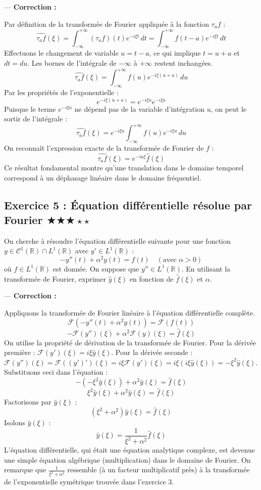 \documentclass[11pt,a4paper]{article}
\begin{document}
---
\textbf{Correction :}

Par définition de la transformée de Fourier appliquée à la fonction $\tau_a f$ :
$$ \widehat{\tau_a f}(\xi) = \int_{-\infty}^{+\infty} (\tau_a f)(t) e^{-i\xi t} \, dt = \int_{-\infty}^{+\infty} f(t-a) e^{-i\xi t} \, dt $$
Effectuons le changement de variable $u = t - a$, ce qui implique $t = u + a$ et $dt = du$. Les bornes de l'intégrale de $-\infty$ à $+\infty$ restent inchangées.
$$ \widehat{\tau_a f}(\xi) = \int_{-\infty}^{+\infty} f(u) e^{-i\xi (u+a)} \, du $$
Par les propriétés de l'exponentielle :
$$ e^{-i\xi (u+a)} = e^{-i\xi u} e^{-i\xi a} $$
Puisque le terme $e^{-i\xi a}$ ne dépend pas de la variable d'intégration $u$, on peut le sortir de l'intégrale :
$$ \widehat{\tau_a f}(\xi) = e^{-i\xi a} \int_{-\infty}^{+\infty} f(u) e^{-i\xi u} \, du $$
On reconnaît l'expression exacte de la transformée de Fourier de $f$ :
$$ \widehat{\tau_a f}(\xi) = e^{-ia\xi} \hat{f}(\xi) $$
Ce résultat fondamental montre qu'une translation dans le domaine temporel correspond à un déphasage linéaire dans le domaine fréquentiel.


\subsection*{Exercice 5 : Équation différentielle résolue par Fourier \quad $\bigstar\bigstar\bigstar\star\star$}

On cherche à résoudre l'équation différentielle suivante pour une fonction $y \in \mathcal{C}^1(\mathbb{R}) \cap L^1(\mathbb{R})$ avec $y' \in L^1(\mathbb{R})$ :
$$ -y''(t) + \alpha^2 y(t) = f(t) \quad (\text{avec } \alpha > 0) $$
où $f \in L^1(\mathbb{R})$ est donnée.
On suppose que $y'' \in L^1(\mathbb{R})$.
En utilisant la transformée de Fourier, exprimer $\hat{y}(\xi)$ en fonction de $\hat{f}(\xi)$ et $\alpha$.

---
\textbf{Correction :}

Appliquons la transformée de Fourier linéaire à l'équation différentielle complète.
$$ \mathcal{F}(-y''(t) + \alpha^2 y(t)) = \mathcal{F}(f(t)) $$
$$ -\mathcal{F}(y'')(\xi) + \alpha^2 \mathcal{F}(y)(\xi) = \hat{f}(\xi) $$
On utilise la propriété de dérivation de la transformée de Fourier.
Pour la dérivée première : $\mathcal{F}(y')(\xi) = i\xi \hat{y}(\xi)$.
Pour la dérivée seconde : $\mathcal{F}(y'')(\xi) = \mathcal{F}((y')')(\xi) = i\xi \mathcal{F}(y')(\xi) = i\xi (i\xi \hat{y}(\xi)) = -\xi^2 \hat{y}(\xi)$.
Substituons ceci dans l'équation :
$$ -(-\xi^2 \hat{y}(\xi)) + \alpha^2 \hat{y}(\xi) = \hat{f}(\xi) $$
$$ \xi^2 \hat{y}(\xi) + \alpha^2 \hat{y}(\xi) = \hat{f}(\xi) $$
Factorisons par $\hat{y}(\xi)$ :
$$ (\xi^2 + \alpha^2) \hat{y}(\xi) = \hat{f}(\xi) $$
Isolons $\hat{y}(\xi)$ :
$$ \hat{y}(\xi) = \frac{1}{\xi^2 + \alpha^2} \hat{f}(\xi) $$
L'équation différentielle, qui était une équation analytique complexe, est devenue une simple équation algébrique (multiplication) dans le domaine de Fourier.
On remarque que $\frac{1}{\xi^2 + \alpha^2}$ ressemble (à un facteur multiplicatif près) à la transformée de l'exponentielle symétrique trouvée dans l'exercice 3.
\end{document}
